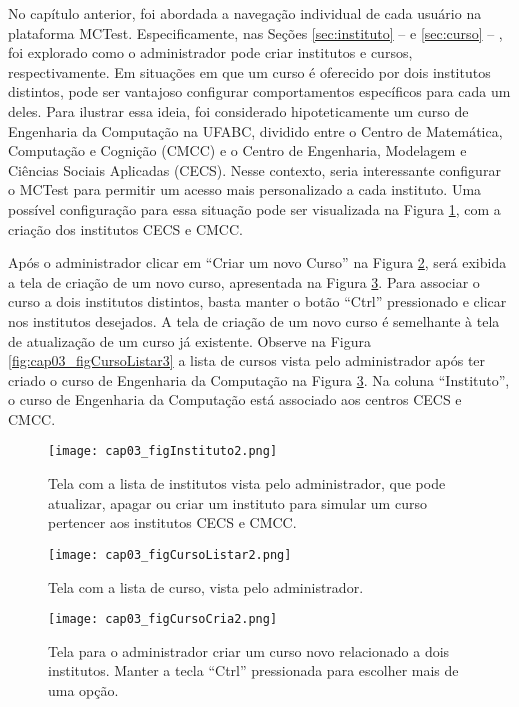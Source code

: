 No capítulo anterior, foi abordada a navegação individual de cada usuário na plataforma MCTest. Especificamente, nas Seções \ref{sec:instituto} --  e \ref{sec:curso} -- , foi explorado como o administrador pode criar institutos e cursos, respectivamente. Em situações em que um curso é oferecido por dois institutos distintos, pode ser vantajoso configurar comportamentos específicos para cada um deles. Para ilustrar essa ideia, foi considerado hipoteticamente um curso de Engenharia da Computação na UFABC, dividido entre o Centro de Matemática, Computação e Cognição (CMCC) e o Centro de Engenharia, Modelagem e Ciências Sociais Aplicadas (CECS). Nesse contexto, seria interessante configurar o MCTest para permitir um acesso mais personalizado a cada instituto. Uma possível configuração para essa situação pode ser visualizada na Figura \ref{fig:cap03_instituicao2}, com a criação dos institutos CECS e CMCC.

Após o administrador clicar em ``Criar um novo Curso'' na Figura \ref{fig:cap03_figCursoListar2}, será exibida a tela de criação de um novo curso, apresentada na Figura \ref{fig:cap03_cursoCria2}. Para associar o curso a dois institutos distintos, basta manter o botão ``Ctrl'' pressionado e clicar nos institutos desejados. A tela de criação de um novo curso é semelhante à tela de atualização de um curso já existente. Observe na Figura \ref{fig:cap03_figCursoListar3} a lista de cursos vista pelo administrador após ter criado o curso de Engenharia da Computação na Figura \ref{fig:cap03_cursoCria2}. Na coluna ``Instituto'', o curso de Engenharia da Computação está associado aos centros CECS e CMCC.

\begin{figure}[!ht]
  \centering
  \texttt{[image: cap03\_figInstituto2.png]}
  \caption{Tela com a lista de institutos vista pelo administrador, que pode atualizar, apagar ou criar um instituto para simular um curso pertencer aos institutos CECS e CMCC.}
  \label{fig:cap03_instituicao2}
\end{figure}

\begin{figure}[!ht]
  \centering
  \texttt{[image: cap03\_figCursoListar2.png]}
  \caption{Tela com a lista de curso, vista pelo administrador.}
  \label{fig:cap03_figCursoListar2}
\end{figure}

\begin{figure}[!ht]
  \centering
  \texttt{[image: cap03\_figCursoCria2.png]}
  \caption{Tela para o administrador criar um curso novo relacionado a dois institutos. Manter a tecla ``Ctrl'' pressionada para escolher mais de uma opção.}
  \label{fig:cap03_cursoCria2}
\end{figure}


